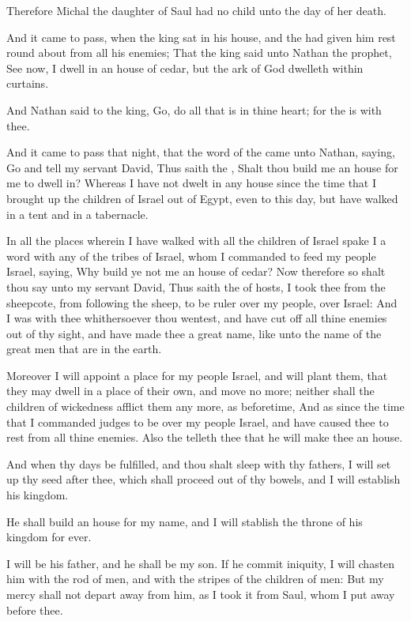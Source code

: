 \Verse Therefore Michal the daughter of Saul had no child unto the day of her death.


\Chapter
\Verse And it came to pass, when the king sat in his house, and the \LORD had given him rest round about from all his enemies; \Verse That the king said unto Nathan the prophet, See now, I dwell in an house of cedar, but the ark of God dwelleth within curtains.

\Verse And Nathan said to the king, Go, do all that is in thine heart; for the \LORD is with thee.

\Verse And it came to pass that night, that the word of the \LORD came unto Nathan, saying, \Verse Go and tell my servant David, Thus saith the \LORD, Shalt thou build me an house for me to dwell in?  \Verse Whereas I have not dwelt in any house since the time that I brought up the children of Israel out of Egypt, even to this day, but have walked in a tent and in a tabernacle.

\Verse In all the places wherein I have walked with all the children of Israel spake I a word with any of the tribes of Israel, whom I commanded to feed my people Israel, saying, Why build ye not me an house of cedar?  \Verse Now therefore so shalt thou say unto my servant David, Thus saith the \LORD of hosts, I took thee from the sheepcote, from following the sheep, to be ruler over my people, over Israel: \Verse And I was with thee whithersoever thou wentest, and have cut off all thine enemies out of thy sight, and have made thee a great name, like unto the name of the great men that are in the earth.

\Verse Moreover I will appoint a place for my people Israel, and will plant them, that they may dwell in a place of their own, and move no more; neither shall the children of wickedness afflict them any more, as beforetime, \Verse And as since the time that I commanded judges to be over my people Israel, and have caused thee to rest from all thine enemies. Also the \LORD telleth thee that he will make thee an house.

\Verse And when thy days be fulfilled, and thou shalt sleep with thy fathers, I will set up thy seed after thee, which shall proceed out of thy bowels, and I will establish his kingdom.

\Verse He shall build an house for my name, and I will stablish the throne of his kingdom for ever.

\Verse I will be his father, and he shall be my son. If he commit iniquity, I will chasten him with the rod of men, and with the stripes of the children of men: \Verse But my mercy shall not depart away from him, as I took it from Saul, whom I put away before thee.

